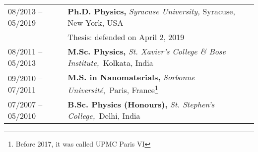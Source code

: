 


\begin{longtable}{R{3.5cm}|p{14.8cm}}
 	\textsc{08/2013 -- 05/2019} &\textbf{Ph.D. Physics, } \emph{Syracuse University,} Syracuse, New York, USA\\ 
& Thesis:  defended on April 2, 2019 \\ %
	\textsc{08/2011 -- 05/2013} & \textbf{M.Sc. Physics, }\emph{St. Xavier's College \& Bose Institute,}{~Kolkata, }{India} \\
\textsc{09/2010 -- 07/2011} &\textbf{M.S. in Nanomaterials, }\emph{Sorbonne Universit\'{e}},{~Paris, }{France}\footnote{Before 2017, it was called UPMC Paris VI} \\
\textsc{07/2007 -- 05/2010} & \textbf{B.Sc. Physics (Honours),} \emph{St. Stephen's College,}{~Delhi, }{India} \\	
\end{longtable}
